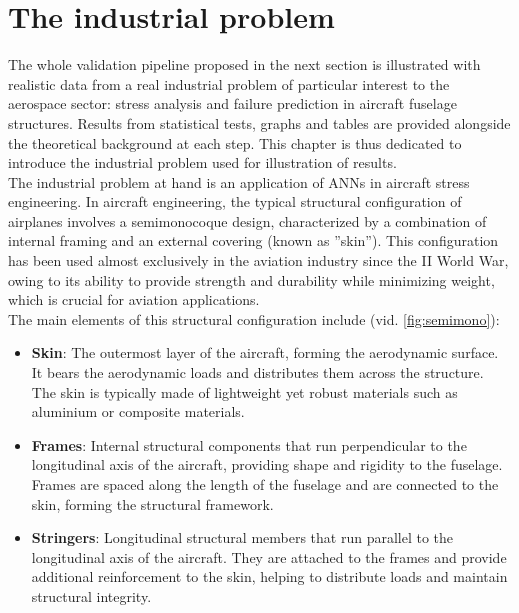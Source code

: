 \chapter{The industrial problem}\label{chap:2}
The whole validation pipeline proposed in the next section is illustrated with realistic data from a real industrial problem of particular interest to the aerospace sector: stress analysis and failure prediction in aircraft fuselage structures. Results from statistical tests, graphs and tables are provided alongside the theoretical background at each step. This chapter is thus dedicated to introduce the industrial problem used for illustration of results.\\
%
\indent The industrial problem at hand is an application of ANNs in aircraft stress engineering. In aircraft engineering, the typical structural configuration of airplanes involves a semimonocoque design, characterized by a combination of internal framing and an external covering (known as ''skin''). This configuration has been used almost exclusively in the aviation industry since the II World War, owing to its ability to provide strength and durability while minimizing weight, which is crucial for aviation applications.\\
%
\indent The main elements of this structural configuration include (vid. \autoref{fig:semimono}):
\begin{itemize}
\item \textbf{Skin}: The outermost layer of the aircraft, forming the aerodynamic surface. It bears the aerodynamic loads and distributes them across the structure. The skin is typically made of lightweight yet robust materials such as aluminium or composite materials.
\item \textbf{Frames}: Internal structural components that run perpendicular to the longitudinal axis of the aircraft, providing shape and rigidity to the fuselage. Frames are spaced along the length of the fuselage and are connected to the skin, forming the structural framework.
\item \textbf{Stringers}: Longitudinal structural members that run parallel to the longitudinal axis of the aircraft. They are attached to the frames and provide additional reinforcement to the skin, helping to distribute loads and maintain structural integrity.
\end{itemize}

